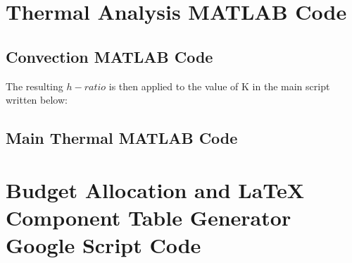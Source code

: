 \documentclass[a4paper,12pt,oneside]{article}
\begin{document}
\begin{appendices}


\newpage
\section{Thermal Analysis MATLAB Code} \label{sec:appJ}
\subsection{Convection MATLAB Code}



The resulting $h-ratio$ is then applied to the value of K in the main script written below:

\subsection{Main Thermal MATLAB Code}




\newpage
\section{Budget Allocation and LaTeX Component Table Generator Google Script Code} \label{sec:appK}

\end{appendices}
\end{document}
